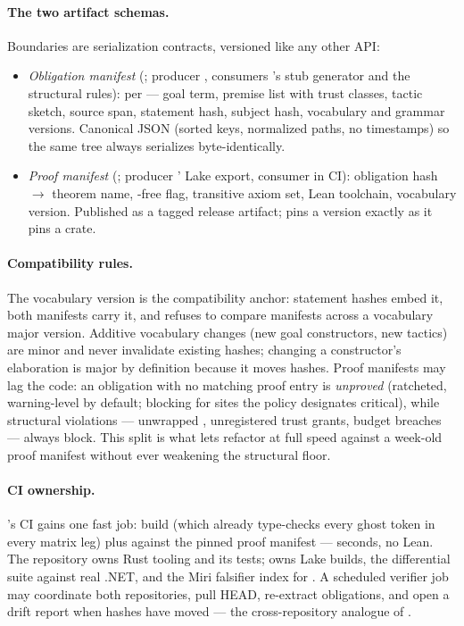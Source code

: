 \paragraph{The two artifact schemas.} Boundaries are serialization
contracts, versioned like any other API:

\begin{itemize}[leftmargin=1.4em]
\item \emph{Obligation manifest} (; producer
  , consumers 's stub generator
  and the structural rules): per  --- goal term,
  premise list with trust classes, tactic sketch, source span,
  statement hash, subject hash, vocabulary and grammar versions.
  Canonical JSON (sorted keys, normalized paths, no timestamps) so the
  same tree always serializes byte-identically.
\item \emph{Proof manifest} (; producer
  ' Lake export, consumer  in
  \dotnetrs{} CI): obligation hash $\to$ theorem name,
  -free flag, transitive axiom set, Lean toolchain,
  vocabulary version. Published as a tagged release artifact;
  \dotnetrs{} pins a version exactly as it pins a crate.
\end{itemize}

\paragraph{Compatibility rules.} The vocabulary version is the
compatibility anchor: statement hashes embed it, both manifests carry
it, and  refuses to compare manifests across a
vocabulary major version. Additive vocabulary changes (new goal
constructors, new tactics) are minor and never invalidate existing
hashes; changing a constructor's elaboration is major by definition
because it moves hashes. Proof manifests may lag the code: an
obligation with no matching proof entry is \emph{unproved} (ratcheted,
warning-level by default; blocking for sites the policy designates
critical),
while structural violations --- unwrapped , unregistered
trust grants, budget breaches --- always block. This split is what
lets \dotnetrs{} refactor at full speed against a week-old proof
manifest without ever weakening the structural floor.

\paragraph{CI ownership.} \dotnetrs{}'s CI gains one fast job: build
(which already type-checks every ghost token in every matrix leg) plus
 against the pinned proof manifest --- seconds, no
Lean. The  repository owns Rust tooling and its tests;
 owns Lake builds, the 
differential suite against real .NET, and the Miri falsifier index for
.  A scheduled verifier job may coordinate both
repositories, pull \dotnetrs{} HEAD, re-extract obligations, and open a
drift report when hashes have moved --- the cross-repository analogue
of .

